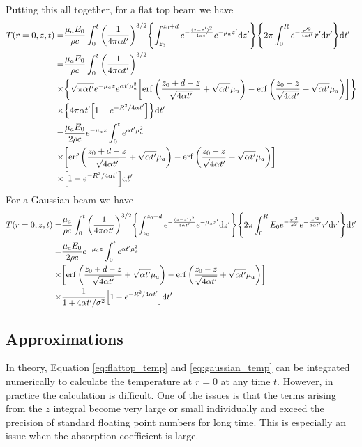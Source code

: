 \documentclass[]{article}
\begin{document}
Putting this all together, for a flat top beam we have
\begin{align}
  \label{eq:flattop_temp}
  T(r=0, z,t) =& \frac{\mu_aE_0}{\rho c} \int_0^t \qty(\frac{1}{4\pi \alpha t'})^{3/2} \qty{\int_{z_0}^{z_0 + d}e^{-\frac{(z-z')^2}{4\alpha t'}} e^{-\mu_a z'} \dd z'} \qty{2\pi\int_{0}^{R} e^{-\frac{r'^2}{4\alpha t'}}r'\dd r'}\dd t' \nonumber \\
  =& \frac{\mu_a E_0}{\rho c} \int_0^t \qty(\frac{1}{4\pi \alpha t'})^{3/2}  \nonumber \\
  \times & \qty{\sqrt{\pi\alpha t'} e^{-\mu_a z} e^{\alpha t'\mu_a^2}\qty[\erf\qty(\frac{z_0 + d - z}{\sqrt{4\alpha t'}} + \sqrt{\alpha t'}\mu_a ) - \erf\qty(\frac{z_0 - z}{\sqrt{4\alpha t'}} + \sqrt{\alpha t'}\mu_a ) ]} \nonumber \\
  \times & \qty{4\pi \alpha t' \qty[1 - e^{-R^2/4\alpha t'}] } \dd t' \nonumber \\
  =& \frac{\mu_aE_0}{2\rho c}e^{-\mu_a z} \int_0^t e^{\alpha t'\mu_a^2}  \nonumber \\
  \times & \qty[\erf\qty(\frac{z_0 + d - z}{\sqrt{4\alpha t'}} + \sqrt{\alpha t'}\mu_a ) - \erf\qty(\frac{z_0 - z}{\sqrt{4\alpha t'}} + \sqrt{\alpha t'}\mu_a ) ] \nonumber \\
  \times & \qty[1 - e^{-R^2/4\alpha t'} ]
  \dd t'
\end{align}
For a Gaussian beam we have
\begin{align}
  \label{eq:gaussian_temp}
  T(r =0,z,t) =& \frac{\mu_a}{\rho c} \int_0^t \qty(\frac{1}{4\pi \alpha t'})^{3/2} \qty{\int_{z_0}^{z_0 + d}e^{-\frac{(z-z')^2}{4\alpha t'}} e^{-\mu_a z'} \dd z'} \qty{2\pi\int_{0}^{R} E_0 e^{-\frac{r'^2}{\sigma^2}} e^{-\frac{r'^2}{4\alpha t'}}r'\dd r'}\dd t' \nonumber \\
  =& \frac{\mu_aE_0}{2\rho c}e^{-\mu_a z} \int_0^t e^{\alpha t'\mu_a^2}  \nonumber \\
  \times & \qty[\erf\qty(\frac{z_0 + d - z}{\sqrt{4\alpha t'}} + \sqrt{\alpha t'}\mu_a ) - \erf\qty(\frac{z_0 - z}{\sqrt{4\alpha t'}} + \sqrt{\alpha t'}\mu_a ) ] \nonumber \\
  \times & \frac{1}{1 + 4\alpha t'/\sigma^2} \qty[1 - e^{-R^2/4\alpha t'} ]
  \dd t'
\end{align}


\subsection{Approximations}

In theory, Equation \ref{eq:flattop_temp} and \ref{eq:gaussian_temp} can be integrated
numerically to calculate the temperature at $r = 0$ at any time $t$. However,
in practice the calculation is difficult. One of the issues is that the
terms arising from the $z$ integral become very large or small individually and
exceed the precision of standard floating point numbers for long time. This
is especially an issue when the absorption coefficient is large.
\end{document}

